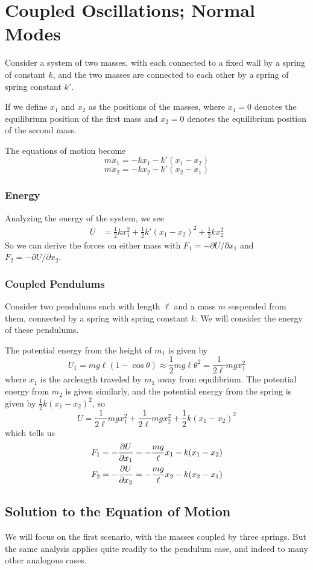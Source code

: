 \chapter{Coupled Oscillations; Normal Modes}
Consider a system of two masses, with each connected to a fixed wall by a spring of constant $k$, and the two masses are connected to each other by a spring of spring constant $k'$. 

If we define $x_1$ and $x_2$ as the positions of the masses, where $x_1=0$ denotes the equilibrium position of the first mass and $x_2=0$ denotes the equilibrium position of the second mass.

The equations of motion become
\[ m\ddot x_1 = -kx_1 - k'(x_1-x_2)\]
\[ m\ddot x_2 = -kx_2 -k'(x_2-x_1)\]
\subsection*{Energy}
Analyzing the energy of the system, we see
\begin{align*}
    U &= \frac{1}{2}kx_1^2 + \frac{1}{2}k'(x_1-x_2)^2 + \frac{1}{2}kx_2^2  
\end{align*}
So we can derive the forces on either mass with $F_1 = -\partial U/\partial x_1$ and $F_2 = -\partial U/\partial x_2$. 

\subsection*{Coupled Pendulums}
Consider two pendulums each with length $\ell$ and a mass $m$ suspended from them, connected by a spring with spring constant $k$. We will consider the energy of these pendulums.

The potential energy from the height of $m_1$ is given by 
\[ U_1 = mg\ell(1-\cos\theta) \approx \frac{1}{2}mg\ell\theta^2 = \frac{1}{2\ell}mgx_1^2 \]
where $x_1$ is the arclength traveled by $m_1$ away from equilibrium. The potential energy from $m_2$ is given similarly, and the potential energy from the spring is given by $\frac{1}2 k(x_1-x_2)^2$, so
\[ U = \frac{1}{2\ell}mgx_1^2 + \frac{1}{2\ell}mgx_2^2 + \frac{1}{2}k(x_1-x_2)^2\]
which tells us
\begin{align*}
    F_1 = -\pdv{U}{x_1} &= -\frac{mg}{\ell}x_1 - k(x_1-x_2) \\
    F_2 = -\pdv{U}{x_2} &= -\frac{mg}{\ell}x_2 - k(x_2-x_1)
\end{align*}

\section{Solution to the Equation of Motion}
We will focus on the first scenario, with the masses coupled by three springs. But the same analysis applies quite readily to the pendulum case, and indeed to many other analogous cases.
